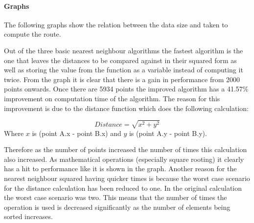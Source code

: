 \documentclass[conference,backref=page]{acmsiggraph}
\begin{document}
\paragraph{Graphs} \hfill

The following graphs show the relation between the data size and taken to compute the route.


Out of the three basic nearest neighbour algorithms the fastest algorithm is the one that leaves the distances to be compared against in their squared form as well as storing the value from the function as a variable instead of computing it twice. From the graph it is clear that there is a gain in performance from 2000 points onwards. Once there are 5934 points the improved algorithm has a 41.57\% improvement on computation time of the algorithm. The reason for this improvement is due to the distance function which does the following calculation:

\begin{equation}
Distance = \sqrt{x^2 + y^2}
\end{equation}
Where $x$ is (point A.x - point B.x) and $y$ is (point A.y - point B.y).

Therefore as the number of points increased the number of times this calculation also increased. As mathematical operations (especially square rooting) it clearly has a hit to performance like it is shown in the graph. Another reason for the nearest neighbour squared having quicker times is because the worst case scenario for the distance calculation has been reduced to one. In the original calculation the worst case scenario was two. This means that the number of times the operation is used is decreased significantly as the number of elements being sorted increases.
\end{document}
